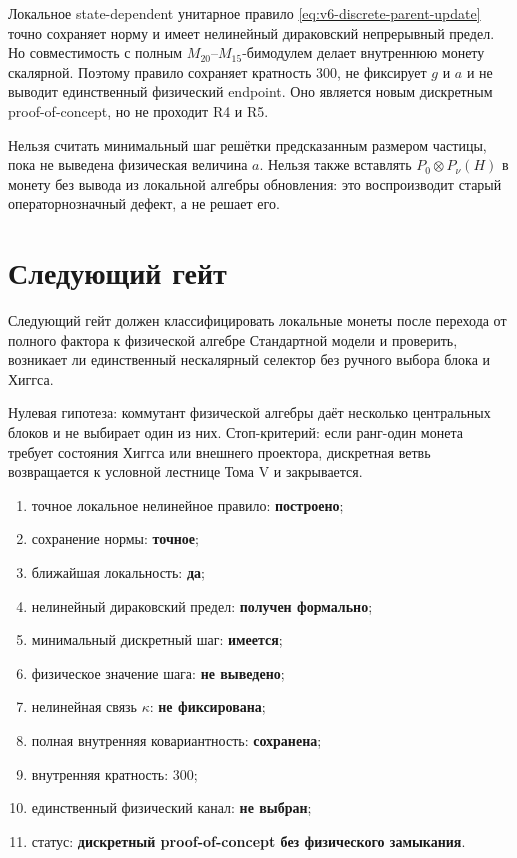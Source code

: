 \begin{theorem}
Локальное state-dependent унитарное правило
\eqref{eq:v6-discrete-parent-update} точно сохраняет норму и имеет
нелинейный дираковский непрерывный предел. Но совместимость с полным
$M_{20}$--$M_{15}$-бимодулем делает внутреннюю монету скалярной. Поэтому
правило сохраняет кратность $300$, не фиксирует $g$ и $a$ и не выводит
единственный физический endpoint. Оно является новым дискретным
proof-of-concept, но не проходит R4 и R5.
\end{theorem}

\begin{nogocriterion}
Нельзя считать минимальный шаг решётки предсказанным размером частицы,
пока не выведена физическая величина $a$. Нельзя также вставлять
$P_0\otimes P_\nu(H)$ в монету без вывода из локальной алгебры обновления:
это воспроизводит старый операторнозначный дефект, а не решает его.
\end{nogocriterion}

\section{Следующий гейт}

Следующий гейт
должен классифицировать локальные монеты после перехода от полного фактора
к физической алгебре Стандартной модели и проверить, возникает ли
единственный нескалярный селектор без ручного выбора блока и Хиггса.

Нулевая гипотеза: коммутант физической алгебры даёт несколько центральных
блоков и не выбирает один из них. Стоп-критерий: если ранг-один монета
требует состояния Хиггса или внешнего проектора, дискретная ветвь
возвращается к условной лестнице Тома V и закрывается.

\begin{protocol}
\begin{enumerate}
 \item точное локальное нелинейное правило: \textbf{построено};
 \item сохранение нормы: \textbf{точное};
 \item ближайшая локальность: \textbf{да};
 \item нелинейный дираковский предел: \textbf{получен формально};
 \item минимальный дискретный шаг: \textbf{имеется};
 \item физическое значение шага: \textbf{не выведено};
 \item нелинейная связь $\kappa$: \textbf{не фиксирована};
 \item полная внутренняя ковариантность: \textbf{сохранена};
 \item внутренняя кратность: \textbf{$300$};
 \item единственный физический канал: \textbf{не выбран};
 \item статус: \textbf{дискретный proof-of-concept без физического замыкания}.
\end{enumerate}
\end{protocol}

